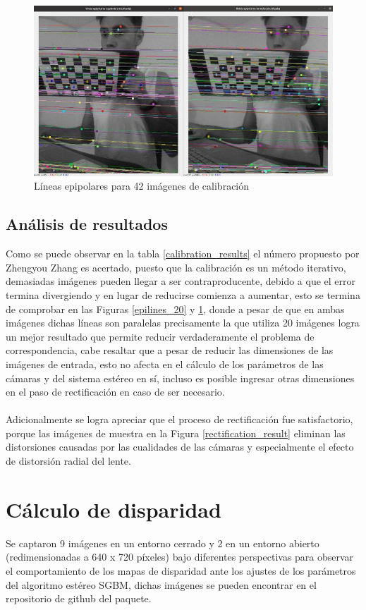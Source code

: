 \begin{figure}[H]
    \centering
    \includegraphics[scale=0.3]{Recursos/epilines_42_calibration_images.jpg}
    \caption{Líneas epipolares para 42 imágenes de calibración}
    \label{epilines_42}
\end{figure}
\subsection{Análisis de resultados}
Como se puede observar en la tabla \ref{calibration_results} el número propuesto por Zhengyou Zhang \cite{Zhang2000} es acertado, puesto que la calibración es un método iterativo, demasiadas imágenes pueden llegar a ser contraproducente, debido a que el error termina divergiendo y en lugar de reducirse comienza a aumentar, esto se termina de comprobar en las Figuras \ref{epilines_20} y \ref{epilines_42}, donde a pesar de que en ambas imágenes dichas líneas son paralelas precisamente la que utiliza 20 imágenes logra un mejor resultado que permite reducir verdaderamente el problema de correspondencia, cabe resaltar que a pesar de reducir las dimensiones de las imágenes de entrada, esto no afecta en el cálculo de los parámetros de las cámaras y del sistema estéreo en sí, incluso es posible ingresar otras dimensiones en el paso de rectificación en caso de ser necesario. 
\\
\\
Adicionalmente se logra apreciar que el proceso de rectificación fue satisfactorio, porque las imágenes de muestra en la Figura \ref{rectification_result} eliminan las distorsiones causadas por las cualidades de las cámaras y especialmente el efecto de distorsión radial del lente.
\section{Cálculo de disparidad}
Se captaron 9 imágenes en un entorno cerrado y 2 en un entorno abierto (redimensionadas a 640 x 720 píxeles) bajo diferentes perspectivas para observar el comportamiento de los mapas de disparidad ante los ajustes de los parámetros del algoritmo estéreo SGBM, dichas imágenes se pueden encontrar en el repositorio de github del paquete.
